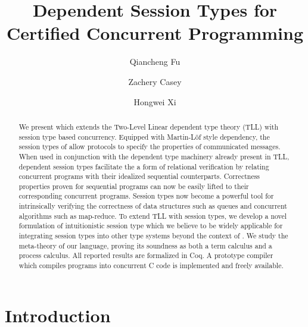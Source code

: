 \documentclass[acmsmall,10pt,anonymous]{acmart}
\begin{document}
\title{Dependent Session Types for Certified Concurrent Programming}

\author{Qiancheng Fu}

\author{Zachery Casey}

\author{Hongwei Xi}

\begin{abstract}
We present \TLLC{} which extends the Two-Level Linear dependent type theory
(TLL) with session type based concurrency. Equipped with Martin-L\"{o}f style
dependency, the session types of \TLLC{} allow protocols to specify the
properties of communicated messages. When used in conjunction with the dependent
type machinery already present in TLL, dependent session types facilitate the a
form of relational verification by relating concurrent programs with their
idealized sequential counterparts. Correctness properties proven for sequential
programs can now be easily lifted to their corresponding concurrent programs.
Session types now become a powerful tool for intrinsically verifying the
correctness of data structures such as queues and concurrent algorithms such as
map-reduce. To extend TLL with session types, we develop a novel formulation of
intuitionistic session type which we believe to be widely applicable for
integrating session types into other type systems beyond the context of \TLLC{}.
We study the meta-theory of our language, proving its soundness as both a term
calculus and a process calculus. All reported results are formalized in Coq.
A prototype compiler which compiles \TLLC{} programs into concurrent C code is
implemented and freely available.
\end{abstract}

\maketitle

\section{Introduction}\label{sec:intro}

\end{document}
